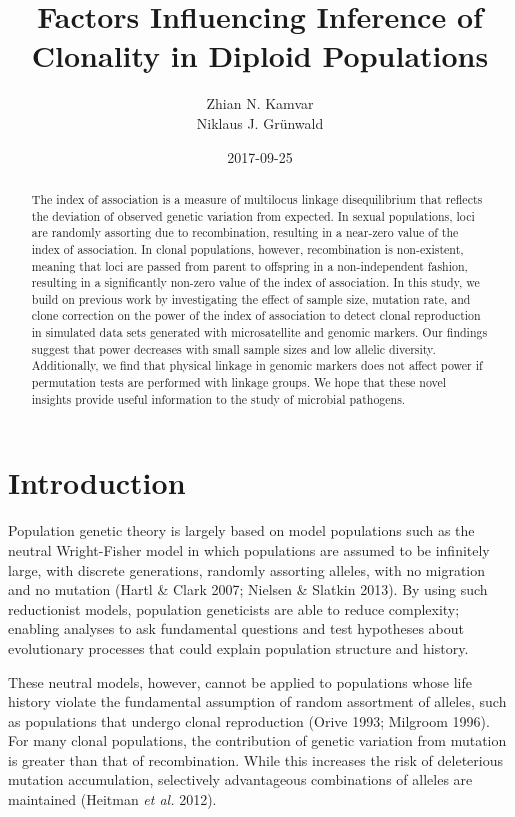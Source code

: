 \documentclass[]{article}
\title{Factors Influencing Inference of Clonality in Diploid Populations}
\author{Zhian N. Kamvar \\ Niklaus J. Grünwald}
\date{2017-09-25}
\theoremstyle{definition}
\theoremstyle{definition}
\theoremstyle{definition}
\theoremstyle{remark}
\begin{document}
\maketitle
\begin{abstract}
The index of association is a measure of multilocus linkage
disequilibrium that reflects the deviation of observed genetic variation
from expected. In sexual populations, loci are randomly assorting due to
recombination, resulting in a near-zero value of the index of
association. In clonal populations, however, recombination is
non-existent, meaning that loci are passed from parent to offspring in a
non-independent fashion, resulting in a significantly non-zero value of
the index of association. In this study, we build on previous work by
investigating the effect of sample size, mutation rate, and clone
correction on the power of the index of association to detect clonal
reproduction in simulated data sets generated with microsatellite and
genomic markers. Our findings suggest that power decreases with small
sample sizes and low allelic diversity. Additionally, we find that
physical linkage in genomic markers does not affect power if permutation
tests are performed with linkage groups. We hope that these novel
insights provide useful information to the study of microbial pathogens.
\end{abstract}

\section{Introduction}\label{introduction}

Population genetic theory is largely based on model populations such as
the neutral Wright-Fisher model in which populations are assumed to be
infinitely large, with discrete generations, randomly assorting alleles,
with no migration and no mutation (Hartl \& Clark 2007; Nielsen \&
Slatkin 2013). By using such reductionist models, population geneticists
are able to reduce complexity; enabling analyses to ask fundamental
questions and test hypotheses about evolutionary processes that could
explain population structure and history.

These neutral models, however, cannot be applied to populations whose
life history violate the fundamental assumption of random assortment of
alleles, such as populations that undergo clonal reproduction (Orive
1993; Milgroom 1996). For many clonal populations, the contribution of
genetic variation from mutation is greater than that of recombination.
While this increases the risk of deleterious mutation accumulation,
selectively advantageous combinations of alleles are maintained (Heitman
\emph{et al.} 2012).
\end{document}
